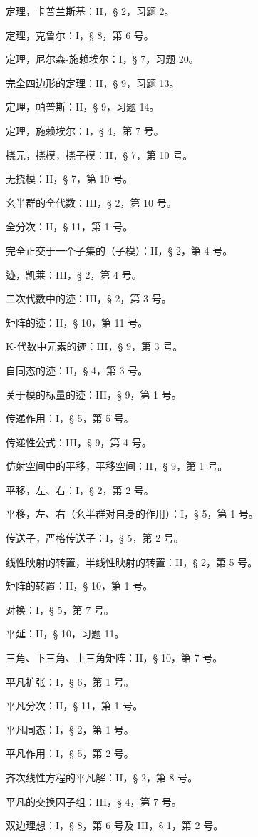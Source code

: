 定理，卡普兰斯基：II，§ 2，习题 2。

定理，克鲁尔：I，§ 8，第 6 号。

定理，尼尔森-施赖埃尔：I，§ 7，习题 20。

完全四边形的定理：II，§ 9，习题 13。

定理，帕普斯：II，§ 9，习题 14。

定理，施赖埃尔：I，§ 4，第 7 号。

挠元，挠模，挠子模：II，§ 7，第 10 号。

无挠模：II，§ 7，第 10 号。

幺半群的全代数：III，§ 2，第 10 号。

全分次：II，§ 11，第 1 号。

完全正交于一个子集的（子模）：II，§ 2，第 4 号。

迹，凯莱：III，§ 2，第 4 号。

二次代数中的迹：III，§ 2，第 3 号。

矩阵的迹：II，§ 10，第 11 号。

K-代数中元素的迹：III，§ 9，第 3 号。

自同态的迹：II，§ 4，第 3 号。

关于模的标量的迹：III，§ 9，第 1 号。

传递作用：I，§ 5，第 5 号。

传递性公式：III，§ 9，第 4 号。

仿射空间中的平移，平移空间：II，§ 9，第 1 号。

平移，左、右：I，§ 2，第 2 号。

平移，左、右（幺半群对自身的作用）：I，§ 5，第 1 号。

传送子，严格传送子：I，§ 5，第 2 号。

线性映射的转置，半线性映射的转置：II，§ 2，第 5 号。

矩阵的转置：II，§ 10，第 1 号。

对换：I，§ 5，第 7 号。

平延：II，§ 10，习题 11。

三角、下三角、上三角矩阵：II，§ 10，第 7 号。

平凡扩张：I，§ 6，第 1 号。

平凡分次：II，§ 11，第 1 号。

平凡同态：I，§ 2，第 1 号。

平凡作用：I，§ 5，第 2 号。

齐次线性方程的平凡解：II，§ 2，第 8 号。

平凡的交换因子组：III，§ 4，第 7 号。

双边理想：I，§ 8，第 6 号及 III，§ 1，第 2 号。

